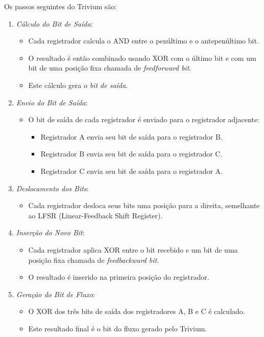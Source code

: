 Os passos seguintes do Trivium são:
\begin{enumerate}
    \item {\em Cálculo do Bit de Saída}:
    \begin{itemize}
        \item Cada registrador calcula o AND entre o penúltimo e o antepenúltimo bit.
        \item O resultado é então combinado usando XOR com o último bit e com um bit de uma posição fixa chamada de \textit{feedforward bit}.
        \item Este cálculo gera o \textit{bit de saída}.
    \end{itemize}
    
    \item {\em Envio do Bit de Saída}:
    \begin{itemize}
        \item O bit de saída de cada registrador é enviado para o registrador adjacente:
        \begin{itemize}
            \item Registrador A envia seu bit de saída para o registrador B.
            \item Registrador B envia seu bit de saída para o registrador C.
            \item Registrador C envia seu bit de saída para o registrador A.
        \end{itemize}
    \end{itemize}
    
    \item {\em Deslocamento dos Bits}:
    \begin{itemize}
        \item Cada registrador desloca seus bits uma posição para a direita, semelhante ao LFSR (Linear-Feedback Shift Register).
    \end{itemize}
    
    \item {\em Inserção do Novo Bit}:
    \begin{itemize}
        \item Cada registrador aplica XOR entre o bit recebido e um bit de uma posição fixa chamada de \textit{feedbackward bit}.
        \item O resultado é inserido na primeira posição do registrador.
    \end{itemize}
    
    \item {\em Geração do Bit de Fluxo}:
    \begin{itemize}
        \item O XOR dos três bits de saída dos registradores A, B e C é calculado.
        \item Este resultado final é o bit do fluxo gerado pelo Trivium.
    \end{itemize}
\end{enumerate}

